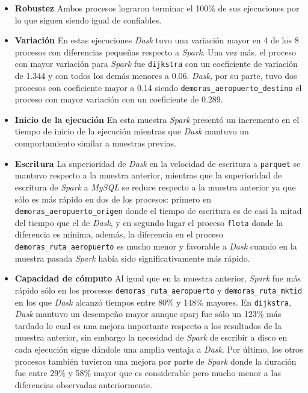 \begin{itemize}
	\item \textbf{Robustez} Ambos procesos lograron terminar el 100\% de sus ejecuciones por lo que siguen siendo igual de confiables.
	
	\item \textbf{Variación} En estas ejecuciones \textit{Dask} tuvo una variación mayor en 4 de los 8 procesos con diferencias pequeñas respecto a \textit{Spark}. Una vez más, el proceso con mayor variación para \textit{Spark} fue \texttt{dijkstra} con un coeficiente de variación de 1.344 y con todos los demás menores a 0.06. \textit{Dask}, por su parte, tuvo dos procesos con coeficiente mayor a 0.14 siendo \texttt{demoras\_aeropuerto\_destino} el proceso con mayor variación con un coeficiente de 0.289.
	
	\item \textbf{Inicio de la ejecución} En esta muestra \textit{Spark} presentó un incremento en el tiempo de inicio de la ejecución mientras que \textit{Dask} mantuvo un comportamiento similar a muestras previas. 
	
	\item \textbf{Escritura} La superioridad de \textit{Dask} en la velocidad de escritura a \texttt{parquet} se mantuvo respecto a la muestra anterior, mientras que la superioridad de escritura de \textit{Spark} a \textit{MySQL} se reduce respecto a la muestra anterior ya que sólo es más rápido en dos de los procesos: primero en \texttt{demoras\_aeropuerto\_origen} donde el tiempo de escritura es de casi la mitad del tiempo que el de \textit{Dask}, y en segundo lugar el proceso \texttt{flota} donde la diferencia es mínima, además, la diferencia en el proceso \texttt{demoras\_ruta\_aeropuerto} es mucho menor y favorable a \textit{Dask} cuando en la muestra pasada \textit{Spark} había sido significativamente más rápido. 
	
	\item \textbf{Capacidad de cómputo} Al igual que en la muestra anterior, \textit{Spark} fue más rápido sólo en los procesos \texttt{demoras\_ruta\_aeropuerto} y \texttt{demoras\_ruta\_mktid} en los que \textit{Dask} alcanzó tiempos entre 80\% y 148\% mayores. En \texttt{dijkstra}, \textit{Dask} mantuvo un desempeño mayor aunque sparj fue sólo un 123\% más tardado lo cual es una mejora importante respecto a los resultados de la muestra anterior, sin embargo la necesidad de \textit{Spark} de escribir a disco en cada ejecución sigue dándole una amplia ventaja a \textit{Dask}. Por último, los otros procesos también tuvieron una mejora por parte de \textit{Spark} donde la duración fue entre 29\% y 58\% mayor que es considerable pero mucho menor a las diferencias observadas anteriormente.
	

\end{itemize}
